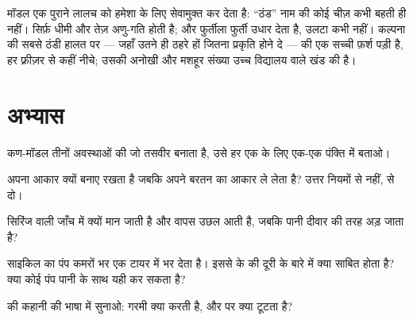 \begin{example}[ठंड कोई पदार्थ नहीं है]\label{ex:g7:states-of-matter:cold}
मॉडल एक पुराने लालच को हमेशा के लिए सेवामुक्त कर देता है: ``ठंड'' नाम
की कोई चीज़ कभी बहती ही नहीं। सिर्फ़ धीमी और तेज़ अणु-गति होती है; और
फुर्तीला फुर्ती उधार देता है, उलटा कभी नहीं। कल्पना की सबसे ठंडी हालत
पर --- जहाँ  उतने ही ठहरे हों जितना प्रकृति होने दे ---  की एक
सच्ची फ़र्श पड़ी है, हर फ़्रीज़र से कहीं नीचे; उसकी अनोखी और मशहूर
संख्या उच्च विद्यालय वाले खंड की है।
\end{example}

\section{अभ्यास}

\begin{exercise}[$\star$]\label{exo:g7:states-of-matter:1}
कण-मॉडल तीनों अवस्थाओं की जो तसवीर बनाता है, उसे हर एक के लिए एक-एक
पंक्ति में बताओ।
\end{exercise}

\begin{exercise}[$\star$]\label{exo:g7:states-of-matter:2}
 अपना आकार क्यों बनाए रखता है जबकि  अपने बरतन का आकार ले लेता
है? उत्तर नियमों से नहीं,  से दो।
\end{exercise}

\begin{exercise}[$\star$]\label{exo:g7:states-of-matter:3}
सिरिंज वाली जाँच में  क्यों मान जाती है और वापस उछल आती है, जबकि
पानी दीवार की तरह अड़ जाता है?
\end{exercise}

\begin{exercise}[$\star$]\label{exo:g7:states-of-matter:4}
साइकिल का पंप कमरों भर  एक टायर में भर देता है। इससे  के 
की दूरी के बारे में क्या साबित होता है? क्या कोई पंप पानी के साथ यही
कर सकता है?
\end{exercise}

\begin{exercise}[$\star$]\label{exo:g7:states-of-matter:5}
 की कहानी  की भाषा में सुनाओ: गरमी क्या करती है, और  पर
क्या टूटता है?
\end{exercise}

